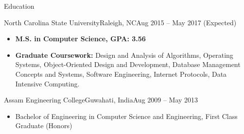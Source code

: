 \documentclass[]{mcdowellcv}
\begin{document}
	\makeheader
	

\begin{cvsection}{Education}
		\begin{cvsubsection}{North Carolina State University}{Raleigh, NC}{Aug 2015 -- May 2017 (Expected)}
			\begin{itemize}
				\item \textbf{M.S. in Computer Science, GPA: 3.56}
				\item \textbf{Graduate Coursework:} Design and Analysis of Algorithms, Operating Systems, Object-Oriented Design and Development, Database Management Concepts and Systems, Software Engineering, Internet Protocols, Data Intensive Computing.
			\end{itemize}
		\end{cvsubsection}
		\begin{cvsubsection}{Assam Engineering College}{Guwahati, India}{Aug 2009 -- May 2013}
			\begin{itemize}
				\item Bachelor of Engineering in Computer Science and Engineering, First Class Graduate (Honors)
			\end{itemize}
		\end{cvsubsection}
	\end{cvsection}
\end{document}
